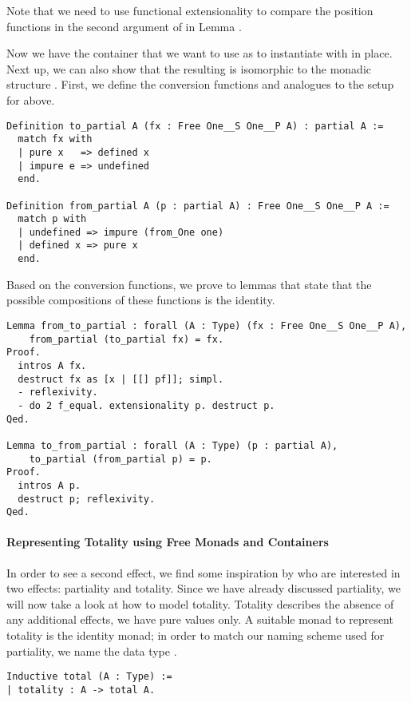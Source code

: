 Note that we need to use functional extensionality to compare the
position functions in the second argument of  in Lemma
.

Now we have the container that we want to use as to instantiate
 with in place.
Next up, we can also show that the resulting 
is isomorphic to the monadic structure .
First, we define the conversion functions  and
 analogues to the setup for  above.

\begin{verbatim}
Definition to_partial A (fx : Free One__S One__P A) : partial A :=
  match fx with
  | pure x   => defined x
  | impure e => undefined
  end.

Definition from_partial A (p : partial A) : Free One__S One__P A :=
  match p with
  | undefined => impure (from_One one)
  | defined x => pure x
  end.
\end{verbatim}

Based on the conversion functions, we prove to lemmas that state that
the possible compositions of these functions is the identity.

\begin{verbatim}
Lemma from_to_partial : forall (A : Type) (fx : Free One__S One__P A),
    from_partial (to_partial fx) = fx.
Proof.
  intros A fx.
  destruct fx as [x | [[] pf]]; simpl.
  - reflexivity.
  - do 2 f_equal. extensionality p. destruct p.
Qed.

Lemma to_from_partial : forall (A : Type) (p : partial A),
    to_partial (from_partial p) = p.
Proof.
  intros A p.
  destruct p; reflexivity.
Qed.
\end{verbatim}

\paragraph{Representing Totality using Free Monads and Containers}
In order to see a second effect, we find some inspiration by
\citet{abel2005verifying} who are interested in two effects:
partiality and totality.
Since we have already discussed partiality, we will now take a look at
how to model totality.
Totality describes the absence of any additional effects, we have pure
values only.
A suitable monad to represent totality is the identity monad; in order
to match our naming scheme used for partiality, we name the data type
.

\begin{verbatim}
Inductive total (A : Type) :=
| totality : A -> total A.
\end{verbatim}

